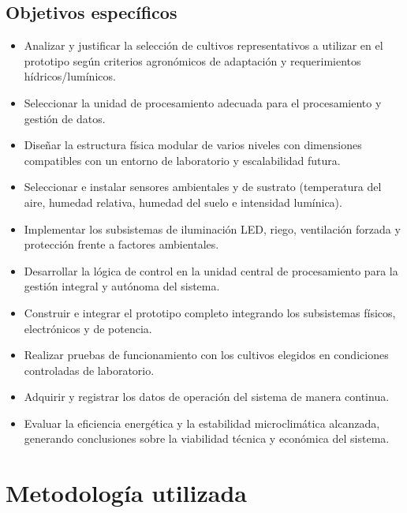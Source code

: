 \subsection{Objetivos específicos}
\begin{itemize}
    \item Analizar y justificar la selección de cultivos representativos a utilizar en el prototipo según criterios agronómicos de adaptación y requerimientos hídricos/lumínicos.
    \item Seleccionar la unidad de procesamiento adecuada para el procesamiento y gestión de datos.
    \item Diseñar la estructura física modular de varios niveles con dimensiones compatibles con un entorno de laboratorio y escalabilidad futura.
    \item Seleccionar e instalar sensores ambientales y de sustrato (temperatura del aire, humedad relativa, humedad del suelo e intensidad lumínica).
    \item Implementar los subsistemas de iluminación LED, riego, ventilación forzada y protección frente a factores ambientales.
    \item Desarrollar la lógica de control en la unidad central de procesamiento para la gestión integral y autónoma del sistema.
    \item Construir e integrar el prototipo completo integrando los subsistemas físicos, electrónicos y de potencia.
    \item Realizar pruebas de funcionamiento con los cultivos elegidos en condiciones controladas de laboratorio.
    \item Adquirir y registrar los datos de operación del sistema de manera continua.
    \item Evaluar la eficiencia energética y la estabilidad microclimática alcanzada, generando conclusiones sobre la viabilidad técnica y económica del sistema.
\end{itemize}

\section{Metodología utilizada}
\label{sec:metodologia}

